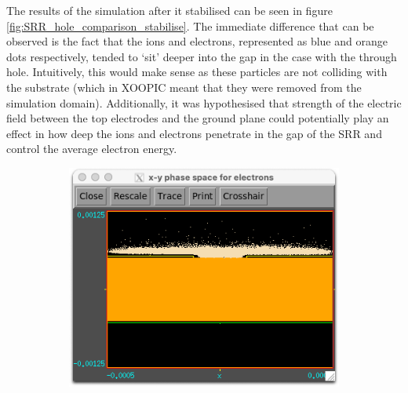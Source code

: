 The results of the simulation after it stabilised can be seen in figure \ref{fig:SRR_hole_comparison_stabilise}. The immediate difference that can be observed is the fact that the ions and electrons, represented as blue and orange dots respectively, tended to `sit' deeper into the gap in the case with the through hole. Intuitively, this would make sense as these particles are not colliding with the substrate (which in XOOPIC meant that they were removed from the simulation domain). Additionally, it was hypothesised that strength of the electric field between the top electrodes and the ground plane could potentially play an effect in how deep the ions and electrons penetrate in the gap of the SRR and control the average electron energy.

\begin{figure}
    \centering
    \begin{subfigure}[b]{0.475\textwidth}
        \centering
        \includegraphics[width=\textwidth]{chapter_4/figures/SRR_no_hole_electrons.png}
        \caption{}
        \label{fig:SRR_no_hole_electrons}
    \end{subfigure}
    \hfill
    \begin{subfigure}[b]{0.475\textwidth}  
        \centering 

\end{subfigure}
\end{figure}
